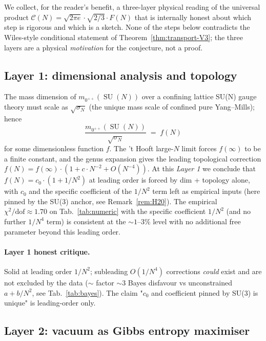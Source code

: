 \documentclass[11pt,a4paper,reqno]{amsart}
\theoremstyle{definition}
\DeclareMathOperator{\SU}{SU}
\begin{document}
We collect, for the reader's benefit, a three-layer physical reading
of the universal product $\mathcal{C}(N) = \sqrt{2\pi e}\cdot
\sqrt{2/3}\cdot F(N)$ that is internally honest about which step is
rigorous and which is a sketch. None of the steps below contradicts
the Wiles-style conditional statement of
Theorem~\ref{thm:transport-V3}; the three layers are a physical
\emph{motivation} for the conjecture, not a proof.

\subsection{Layer 1: dimensional analysis and topology}\label{ss:layer1}

The mass dimension of $m_{0^{++}}(\SU(N))$ over a confining lattice
SU(N) gauge theory must scale as $\sqrt{\sigma_N}$ (the unique
mass scale of confined pure Yang--Mills); hence
\[
   \frac{m_{0^{++}}(\SU(N))}{\sqrt{\sigma_N}} \;=\; f(N)
\]
for some dimensionless function $f$. The 't Hooft large-$N$ limit
\cite{tHooft1974} forces $f(\infty)$ to be a finite constant, and
the genus expansion gives the leading topological correction
$f(N) = f(\infty)\cdot(1 + c\cdot N^{-2} + O(N^{-4}))$. At this
\emph{Layer 1} we conclude that $f(N) = c_0\cdot(1 + 1/N^2)$ at
leading order is forced by dim + topology alone, with $c_0$ and the
specific coefficient of the $1/N^2$ term left as empirical inputs
(here pinned by the SU(3) anchor, see Remark~\ref{rem:H20}). The
empirical $\chi^2/\text{dof}\approx 1.70$ on Tab.~\ref{tab:numeric}
with the specific coefficient $1/N^2$ (and no further
$1/N^4$ term) is consistent at the $\sim 1$--$3\%$ level with no
additional free parameter beyond this leading order.

\paragraph{Layer 1 honest critique.}
Solid at leading order $1/N^2$; subleading $O(1/N^4)$ corrections
\emph{could} exist and are not excluded by the data ($\sim$ factor
$\sim 3$ Bayes disfavour vs unconstrained $a + b/N^2$, see
Tab.~\ref{tab:bayes}). The claim "$c_0$ and coefficient pinned by
SU(3) is unique" is leading-order only.

\subsection{Layer 2: vacuum as Gibbs entropy maximiser}\label{ss:layer2}
\end{document}
